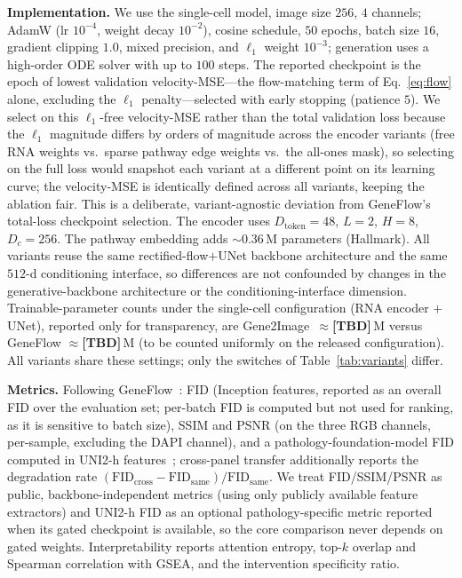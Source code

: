 \documentclass[journal]{IEEEtran}
\newcommand{\TBD}{{\color{red}\textbf{[TBD]}}}
\newcommand{\method}{Gene2Image}
\begin{document}
\textbf{Implementation.}
\label{sec:impl}
We use the single-cell model, image size $256$, $4$ channels; AdamW
(lr $10^{-4}$, weight decay $10^{-2}$), cosine schedule, $50$ epochs, batch size
$16$, gradient clipping $1.0$, mixed precision, and $\ell_1$ weight $10^{-3}$;
generation uses a high-order ODE solver with up to $100$ steps. The reported
checkpoint is the epoch of lowest validation velocity-MSE---the flow-matching
term of Eq.~\ref{eq:flow} alone, excluding the $\ell_1$ penalty---selected with
early stopping (patience $5$). We select on this $\ell_1$-free velocity-MSE rather
than the total validation loss because the $\ell_1$ magnitude differs by orders of
magnitude across the encoder variants (free RNA weights vs.\ sparse pathway edge
weights vs.\ the all-ones mask), so selecting on the full loss would snapshot each
variant at a different point on its learning curve; the velocity-MSE is identically
defined across all variants, keeping the ablation fair. This is a deliberate,
variant-agnostic deviation from GeneFlow's total-loss checkpoint selection. The
encoder uses $D_{\text{token}}{=}48$, $L{=}2$, $H{=}8$, $D_c{=}256$. The pathway embedding adds
$\sim$0.36\,M parameters (Hallmark). All variants reuse the same
rectified-flow$+$UNet backbone architecture and the same $512$-d conditioning
interface, so differences are not confounded by changes in the generative-backbone
architecture or the conditioning-interface dimension. Trainable-parameter counts
under the single-cell configuration (RNA encoder $+$ UNet), reported only for
transparency, are \method\ $\approx$\TBD\,M versus GeneFlow $\approx$\TBD\,M
(to be counted uniformly on the released configuration). All variants share these settings;
only the switches of Table~\ref{tab:variants} differ.

\textbf{Metrics.} Following GeneFlow~\cite{geneflow}: FID (Inception features,
reported as an overall FID over the evaluation set; per-batch FID is computed but
not used for ranking, as it is sensitive to batch size), SSIM and PSNR (on the
three RGB channels, per-sample, excluding the DAPI channel), and a
pathology-foundation-model FID computed in UNI2-h features~\cite{uni,uni2h}; cross-panel
transfer additionally reports the degradation rate
$(\mathrm{FID}_{\text{cross}}-\mathrm{FID}_{\text{same}})/\mathrm{FID}_{\text{same}}$.
We treat FID/SSIM/PSNR as public, backbone-independent metrics (using only
publicly available feature extractors) and UNI2-h FID as an optional
pathology-specific metric reported when its gated checkpoint is available, so the
core comparison never depends on gated weights. Interpretability reports attention
entropy, top-$k$ overlap and Spearman correlation with GSEA, and the intervention
specificity ratio.
\end{document}
